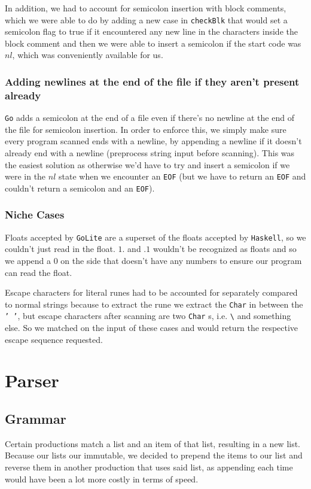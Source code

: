 \documentclass[11pt]{article}
\begin{document}
In addition, we had to account for semicolon insertion with block
comments, which we were able to do by adding a new case in
\texttt{checkBlk} that would set a semicolon flag to true if it
encountered any new line in the characters inside the block comment
and then we were able to insert a semicolon if the start code was
\(nl\), which was conveniently available for us.
\subsubsection{Adding newlines at the end of the file if they aren't present already}
\label{sec:org8f021de}
\texttt{Go} adds a semicolon at the end of a file even if there's no
newline at the end of the file for semicolon insertion. In order
to enforce this, we simply make sure every program scanned ends
with a newline, by appending a newline if it doesn't already end
with a newline (preprocess string input before scanning). This was
the easiest solution as otherwise we'd have to try and insert a
semicolon if we were in the \(nl\) state when we encounter an \texttt{EOF}
(but we have to return an \texttt{EOF} and couldn't return a semicolon
and an \texttt{EOF}).
\subsubsection{Niche Cases}
\label{sec:org478e42a}
Floats accepted by \texttt{GoLite} are a superset of the floats accepted
by \texttt{Haskell}, so we couldn't just read in the float. \(1.\) and
\(.1\) wouldn't be recognized as floats and so we append a \(0\) on
the side that doesn't have any numbers to ensure our program can
read the float.

Escape characters for literal runes had to be accounted for
separately compared to normal strings because to extract the rune
we extract the \texttt{Char} in between the \texttt{' '}, but escape characters
after scanning are two \texttt{Char} s, i.e. \texttt{\textbackslash{}} and something else. So
we matched on the input of these cases and would return the
respective escape sequence requested.
\section{Parser}
\label{sec:orgea87387}
\subsection{Grammar}
\label{sec:org366bf10}
Certain productions match a list and an item of that list,
resulting in a new list. Because our lists our immutable, we
decided to prepend the items to our list and reverse them in
another production that uses said list, as appending each time
would have been a lot more costly in terms of speed.
\end{document}
